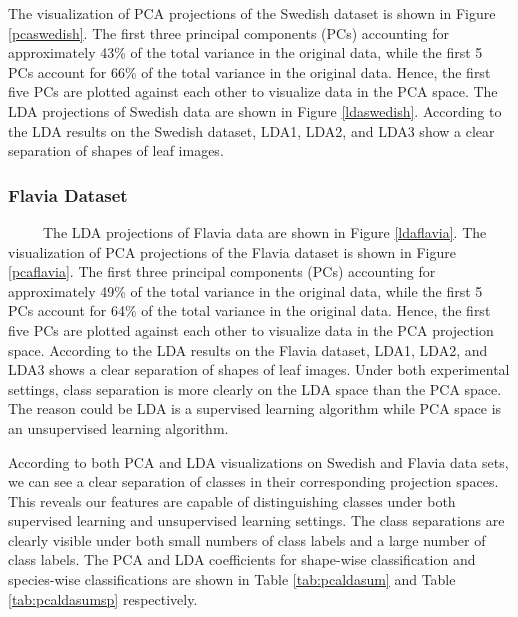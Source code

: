 \documentclass{article}
\begin{document}
The visualization of PCA projections of the Swedish dataset is shown
in Figure \ref{pcaswedish}. The first three principal components (PCs)
accounting for approximately 43\% of the total variance in the original
data, while the first 5 PCs account for 66\% of the total variance in
the original data. Hence, the first five PCs are plotted against each
other to visualize data in the PCA space. The LDA projections of Swedish
data are shown in Figure \ref{ldaswedish}. According to the LDA results
on the Swedish dataset, LDA1, LDA2, and LDA3 show a clear separation of
shapes of leaf images.






\hypertarget{flavia-dataset}{%
\subsubsection{Flavia Dataset}\label{flavia-dataset}}

~~~~~The LDA projections of Flavia data are shown in Figure
\ref{ldaflavia}. The visualization of PCA projections of the Flavia dataset
is shown in Figure \ref{pcaflavia}. The first three principal components
(PCs) accounting for approximately 49\% of the total variance in the
original data, while the first 5 PCs account for 64\% of the total
variance in the original data. Hence, the first five PCs are plotted
against each other to visualize data in the PCA projection space.
According to the LDA results on the Flavia dataset, LDA1, LDA2, and LDA3
shows a clear separation of shapes of leaf images. Under both
experimental settings, class separation is more clearly on the LDA space
than the PCA space. The reason could be LDA is a supervised learning
algorithm while PCA space is an unsupervised learning algorithm.

According to both PCA and LDA visualizations on Swedish and Flavia data
sets, we can see a clear separation of classes in their corresponding
projection spaces. This reveals our features are capable of
distinguishing classes under both supervised learning and unsupervised
learning settings. The class separations are clearly visible under both small numbers of class labels and a large number of class labels. The PCA and LDA coefficients for shape-wise classification and species-wise classifications are shown in Table \ref{tab:pcaldasum} and Table \ref{tab:pcaldasumsp} respectively.
\end{document}
